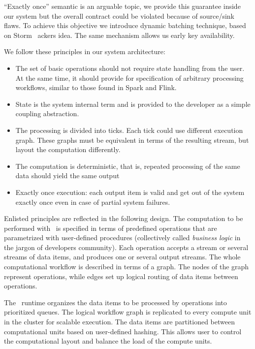 ``Exactly once'' semantic is an arguable topic, we provide this guarantee inside our system but the overall contract could be violated because of source/sink flaws. To achieve this objective we introduce dynamic batching technique, based on Storm~\cite{apache:storm} ackers idea. The same mechanism allows us early key availability.

We follow these principles in our system architecture:
\begin{itemize}
\item The set of basic operations should not require state handling from the user. At the same time, it should provide for specification of arbitrary processing workflows, similar to those found in Spark and Flink.
\item State is the system internal term and is provided to the developer as a simple coupling abstraction.
\item The processing is divided into ticks. Each tick could use different execution graph. These graphs must be equivalent in terms of the resulting stream, but layout the computation differently.
\item The computation is deterministic, that is, repeated processing of the same data should yield the same output
\item Exactly once execution: each output item is valid and get out of the system exactly once even in case of partial system failures.
\end{itemize}

Enlisted principles are reflected in the following design. The computation to be performed with \FlameStream\ is specified in terms of predefined operations that are parametrized with user-defined procedures (collectively called {\em business logic} in the jargon of developers community). Each operation accepts a stream or several streams of data items, and produces one or several output streams. The whole computational workflow is described in terms of a graph. The nodes of the graph represent operations, while edges set up logical routing of data items between operations.

The \FlameStream\ runtime organizes the data items to be processed by operations into prioritized queues. The logical workflow graph is replicated to every compute unit in the cluster for scalable execution. The data items are partitioned between computational units based on user-defined hashing. This allows user to control the computational layout and balance the load of the compute units.

